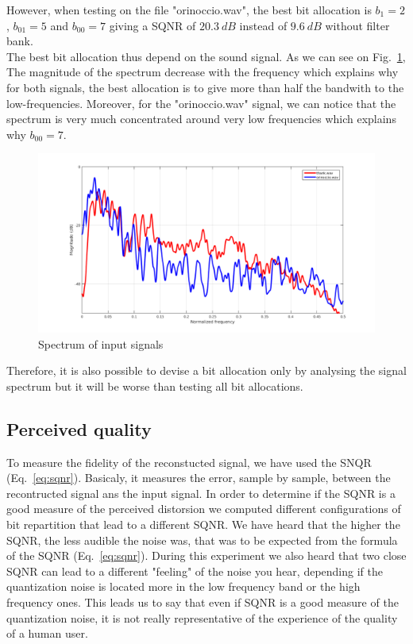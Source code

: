 \documentclass[a4paper,twocolumn]{article}
\begin{document}
However, when testing on the file "orinoccio.wav", the best bit allocation is $b_{1}=2$, $b_{01}=5$ and $b_{00}=7$ giving a SQNR of $20.3~dB$ instead of $9.6~dB$ without filter bank.\\

The best bit allocation thus depend on the sound signal. As we can see on Fig.~\ref{fig:spectrum}, The magnitude of the spectrum decrease with the frequency which explains why for both signals, the best allocation is to give more than half the bandwith to the low-frequencies. Moreover, for the "orinoccio.wav" signal, we can notice that the spectrum is very much concentrated around very low frequencies which explains why $b_{00}=7$.
\begin{figure}[!ht]
  \begin{center}
    \includegraphics[width=1.1\columnwidth]{spectrum3.png}
  \end{center}
  \caption{Spectrum of input signals}
  \label{fig:spectrum}
\end{figure}
Therefore, it is also possible to devise a bit allocation only by analysing the signal spectrum but it will be worse than testing all bit allocations.

\subsection{Perceived quality}
To measure the fidelity of the reconstucted signal, we have used the SNQR (Eq.~\ref{eq:sqnr}). Basicaly, it measures the error, sample by sample, between the recontructed signal ans the input signal. In order to determine if the SQNR is a good measure of the perceived distorsion we computed different configurations of bit repartition that lead to a different SQNR. We have heard that the higher the SQNR, the less audible the noise was, that was to be expected from the formula of the SQNR (Eq.~\ref{eq:sqnr}). During this experiment we also heard that two close SQNR can lead to a different "feeling" of the noise you hear, depending if the quantization noise is located more in the low frequency band or the high frequency ones. This leads us to say that even if SQNR is a good measure of the quantization noise, it is not really representative of the experience of the quality of a human user.
\end{document}
